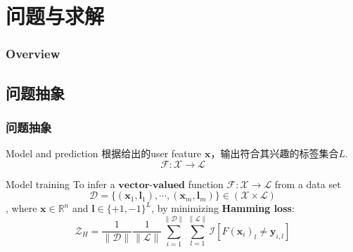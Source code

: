 \documentclass{beamer}
\begin{document}
\section{问题与求解}

\begin{frame}
\frametitle{Overview} %
\tableofcontents[currentsection] %
\end{frame}

\subsection{问题抽象}

\begin{frame}
\frametitle{问题抽象}
\begin{block}{Model and prediction}
根据给出的user feature $\mathbf{x}$，输出符合其兴趣的标签集合$\mathit{L}$.
$$\mathcal{F} : \mathcal{X} \rightarrow \mathcal{L}$$
\end{block}

\pause

\begin{block}{Model training}
To infer a $\textbf{vector-valued}$ function $\mathcal{F} : \mathcal{X} \rightarrow \mathcal{L}$ from a data set
$$\mathcal{D} = \{({\mathbf{x}}_1, {\mathbf{l}}_1), \cdots, ({\mathbf{x}}_m, {\mathbf{l}}_m)\} \in (\mathcal{X} \times \mathcal{L})$$
, where $\mathbf{x} \in \mathbb{R}^n$ and $\mathbf{l} \in {\{+1,-1\}}^L$, by minimizing \textbf{Hamming loss}:
$$\mathcal{Z}_{H} = \frac{1}{\|\mathcal{D}\|} \frac{1}{\|\mathcal{L}\|} \sum_{i=1}^{\|\mathcal{D}\|} \sum_{l=1}^{\|\mathcal{L}\|} \mathcal{I} [ \mathit{F}(\mathbf{x}_i)_l \neq \mathbf{y}_{i,l} ]$$
\end{block}
\end{frame}

\end{document}
